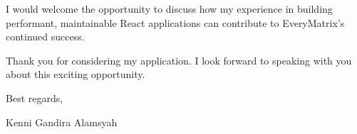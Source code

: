 \documentclass[11pt,a4paper,sans]{moderncv}
\begin{document}
\vspace{8pt}

I would welcome the opportunity to discuss how my experience in building performant, maintainable React applications can contribute to EveryMatrix's continued success.

\vspace{8pt}

Thank you for considering my application. I look forward to speaking with you about this exciting opportunity.

\vspace{10pt}

Best regards,

Kenni Gandira Alamsyah
\end{document}
